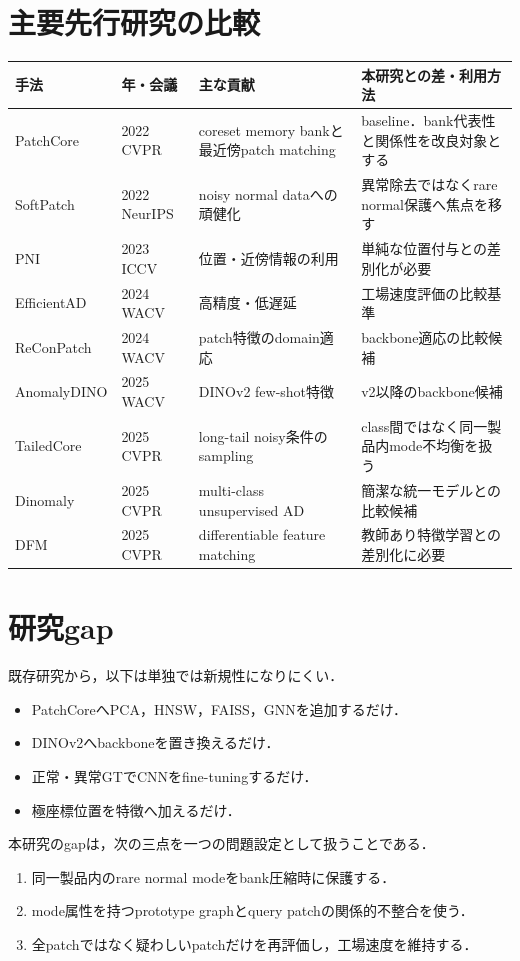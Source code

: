 \documentclass[a4paper,11pt]{ltjsarticle}
\begin{document}
\section{主要先行研究の比較}
\begin{longtable}{L{30mm}L{25mm}L{37mm}L{47mm}}
\toprule
手法 & 年・会議 & 主な貢献 & 本研究との差・利用方法 \\
\midrule
PatchCore & 2022 CVPR & coreset memory bankと最近傍patch matching & baseline．bank代表性と関係性を改良対象とする \\
SoftPatch & 2022 NeurIPS & noisy normal dataへの頑健化 & 異常除去ではなくrare normal保護へ焦点を移す \\
PNI & 2023 ICCV & 位置・近傍情報の利用 & 単純な位置付与との差別化が必要 \\
EfficientAD & 2024 WACV & 高精度・低遅延 & 工場速度評価の比較基準 \\
ReConPatch & 2024 WACV & patch特徴のdomain適応 & backbone適応の比較候補 \\
AnomalyDINO & 2025 WACV & DINOv2 few-shot特徴 & v2以降のbackbone候補 \\
TailedCore & 2025 CVPR & long-tail noisy条件のsampling & class間ではなく同一製品内mode不均衡を扱う \\
Dinomaly & 2025 CVPR & multi-class unsupervised AD & 簡潔な統一モデルとの比較候補 \\
DFM & 2025 CVPR & differentiable feature matching & 教師あり特徴学習との差別化に必要 \\
\bottomrule
\end{longtable}

\section{研究gap}
既存研究から，以下は単独では新規性になりにくい．
\begin{itemize}
  \item PatchCoreへPCA，HNSW，FAISS，GNNを追加するだけ．
  \item DINOv2へbackboneを置き換えるだけ．
  \item 正常・異常GTでCNNをfine-tuningするだけ．
  \item 極座標位置を特徴へ加えるだけ．
\end{itemize}

本研究のgapは，次の三点を一つの問題設定として扱うことである．
\begin{enumerate}
  \item 同一製品内のrare normal modeをbank圧縮時に保護する．
  \item mode属性を持つprototype graphとquery patchの関係的不整合を使う．
  \item 全patchではなく疑わしいpatchだけを再評価し，工場速度を維持する．
\end{enumerate}
\end{document}

